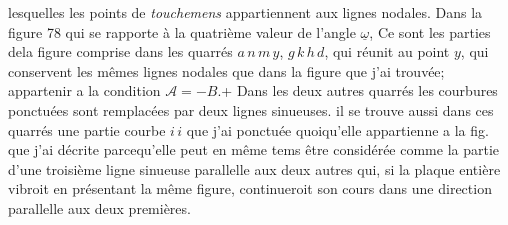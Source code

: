 \documentclass[11pt,a4paper]{article}
\begin{document}
  lesquelles les points de \emph{touchemens} appartiennent aux lignes
nodales. Dans la figure 78 qui se rapporte à la
quatrième valeur de l'angle $\underline{\omega}$,  Ce sont les parties dela
figure comprise dans les quarrés $a\,n\,m\,y$, $g\,k\,h\,d$,  qui 
 réunit   au point $y$, qui conservent les mêmes
lignes nodales que dans la figure que j'ai  trouvée;
appartenir a la condition $\mathcal{A} = -B$.+ 
  Dans les deux
autres quarrés les courbures ponctuées sont remplacées par
deux lignes sinueuses.  il se trouve aussi dans ces quarrés
une partie courbe $i\,i$ que j'ai ponctuée quoiqu'elle
appartienne a la fig. que j'ai décrite parcequ'elle
peut en même tems être considérée comme la partie
d'une troisième ligne sinueuse parallelle aux deux
autres qui, si la plaque entière vibroit en présentant
la même figure, continueroit son cours dans une
direction parallelle aux deux premières.
\end{document}
